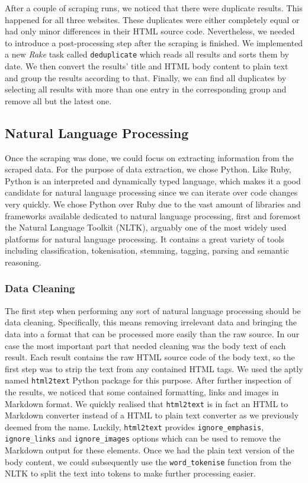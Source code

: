 \documentclass[runningheads]{llncs}
\begin{document}
After a couple of scraping runs, we noticed that there were duplicate results. This happened for all three websites. These duplicates were either completely equal or had only minor differences in their HTML source code. Nevertheless, we needed to introduce a post-processing step after the scraping is finished. We implemented a new \textit{Rake} task called \texttt{deduplicate} which reads all results and sorts them by date. We then convert the results' title and HTML body content to plain text and group the results according to that. Finally, we can find all duplicates by selecting all results with more than one entry in the corresponding group and remove all but the latest one.

\subsection{Natural Language Processing}
\label{sub:natural_language_processing}

Once the scraping was done, we could focus on extracting information from the scraped data. For the purpose of data extraction, we chose Python. Like Ruby, Python is an interpreted and dynamically typed language, which makes it a good candidate for natural language processing since we can iterate over code changes very quickly. We chose Python over Ruby due to the vast amount of libraries and frameworks available dedicated to natural language processing, first and foremost the Natural Language Toolkit (NLTK), arguably one of the most widely used platforms for natural language processing. It contains a great variety of tools including classification, tokenisation, stemming, tagging, parsing and semantic reasoning. \cite{nltk}

\subsubsection{Data Cleaning}
\label{subsub:data_cleaning}

The first step when performing any sort of natural language processing should be data cleaning. Specifically, this means removing irrelevant data and bringing the data into a format that can be processed more easily than the raw source. In our case the most important part that needed cleaning was the body text of each result. Each result contains the raw HTML source code of the body text, so the first step was to strip the text from any contained HTML tags. We used the aptly named \texttt{html2text} Python package for this purpose. After further inspection of the results, we noticed that some contained formatting, links and images in Markdown format. We quickly realised that \texttt{html2text} is in fact an HTML to Markdown converter instead of a HTML to plain text converter as we previously deemed from the name. Luckily, \texttt{html2text} provides \texttt{ignore\_emphasis}, \texttt{ignore\_links} and \texttt{ignore\_images} options which can be used to remove the Markdown output for these elements. Once we had the plain text version of the body content, we could subsequently use the \texttt{word\_tokenise} function from the NLTK to split the text into tokens to make further processing easier.
\end{document}
